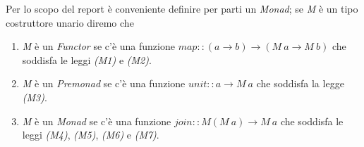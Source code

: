 Per lo scopo del report è conveniente definire per parti un \textit{Monad};
se \textit{M} è un tipo costruttore unario diremo che
\begin{enumerate}
  \item \textit{M} è un \textit{Functor} se c'è una funzione
    $map  :: (a \to b) \to (M \ a \to M \ b) $ che soddisfa le leggi
    \textit{(M1)} e \textit{(M2)}.
  \item \textit{M} è un \textit{Premonad} se c'è una funzione
    $unit :: a \to M\ a$ che soddisfa la legge \textit{(M3)}.
  \item \textit{M} è un \textit{Monad} se c'è una funzione
    $join :: M (M\ a) \to M\ a$ che soddisfa le leggi \textit{(M4)},
    \textit{(M5)}, \textit{(M6)} e \textit{(M7)}.

\end{enumerate}
